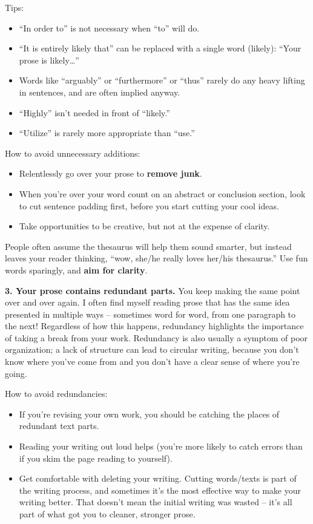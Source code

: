 \documentclass[]{book}
\providecommand{\tightlist}{%
  \setlength{\itemsep}{0pt}\setlength{\parskip}{0pt}}
\theoremstyle{definition}
\theoremstyle{definition}
\theoremstyle{definition}
\theoremstyle{remark}
\begin{document}
Tips:

\begin{itemize}
\tightlist
\item
  ``In order to'' is not necessary when ``to'' will do.
\item
  ``It is entirely likely that'' can be replaced with a single word (likely): ``Your prose is likely\ldots{}''
\item
  Words like ``arguably'' or ``furthermore'' or ``thus'' rarely do any heavy lifting in sentences, and are often implied anyway.
\item
  ``Highly'' isn't needed in front of ``likely.''
\item
  ``Utilize'' is rarely more appropriate than ``use.''
\end{itemize}

How to avoid unnecessary additions:

\begin{itemize}
\tightlist
\item
  Relentlessly go over your prose to \textbf{remove junk}.
\item
  When you're over your word count on an abstract or conclusion section, look to cut sentence padding first, before you start cutting your cool ideas.
\item
  Take opportunities to be creative, but not at the expense of clarity.
\end{itemize}

People often assume the thesaurus will help them sound smarter, but instead leaves your reader thinking, ``wow, she/he really loves her/his thesaurus.'' Use fun words sparingly, and \textbf{aim for clarity}.

\textbf{3. Your prose contains redundant parts.}
You keep making the same point over and over again. I often find myself reading prose that has the same idea presented in multiple ways -- sometimes word for word, from one paragraph to the next! Regardless of how this happens, redundancy highlights the importance of taking a break from your work. Redundancy is also usually a symptom of poor organization; a lack of structure can lead to circular writing, because you don't know where you've come from and you don't have a clear sense of where you're going.

How to avoid redundancies:

\begin{itemize}
\tightlist
\item
  If you're revising your own work, you should be catching the places of redundant text parts.
\item
  Reading your writing out loud helps (you're more likely to catch errors than if you skim the page reading to yourself).
\item
  Get comfortable with deleting your writing. Cutting words/texts is part of the writing process, and sometimes it's the most effective way to make your writing better. That doesn't mean the initial writing was wasted -- it's all part of what got you to cleaner, stronger prose.
\end{itemize}
\end{document}
